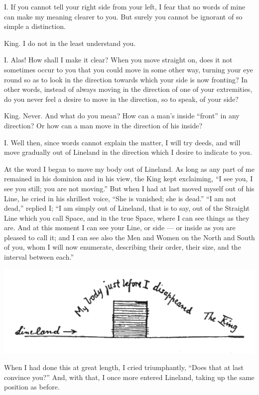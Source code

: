 \documentclass[12pt, a4paper, oneside]{memoir}
\begin{document}
I. If you cannot tell your right side from your left, I fear that no words of
mine can make my meaning clearer to you. But surely you cannot be ignorant of
so simple a distinction.

King. I do not in the least understand you.

I. Alas! How shall I make it clear? When you move straight on, does it not
sometimes occur to you that you could move in some other way, turning your eye
round so as to look in the direction towards which your side is now fronting?
In other words, instead of always moving in the direction of one of your
extremities, do you never feel a desire to move in the direction, so to speak,
of your side?

King. Never. And what do you mean? How can a man's inside ``front'' in any
direction? Or how can a man move in the direction of his inside?

I. Well then, since words cannot explain the matter, I will try deeds, and
will move gradually out of Lineland in the direction which I desire to
indicate to you.

At the word I began to move my body out of Lineland. As long as any part of me
remained in his dominion and in his view, the King kept exclaiming, ``I see
you, I see you still; you are not moving.'' But when I had at last moved myself
out of his Line, he cried in his shrillest voice, ``She is vanished; she is
dead.'' ``I am not dead,'' replied I; ``I am simply out of Lineland, that is to
say, out of the Straight Line which you call Space, and in the true Space,
where I can see things as they are. And at this moment I can see your Line, or
side --- or inside as you are pleased to call it; and I can see also the Men and
Women on the North and South of you, whom I will now enumerate, describing
their order, their size, and the interval between each.''

\includegraphics[trim=20mm 0mm 0mm 0mm,width=\linewidth]{fig7}

When I had done this at great length, I cried triumphantly, ``Does that at last
convince you?'' And, with that, I once more entered Lineland, taking up the
same position as before.
\end{document}
